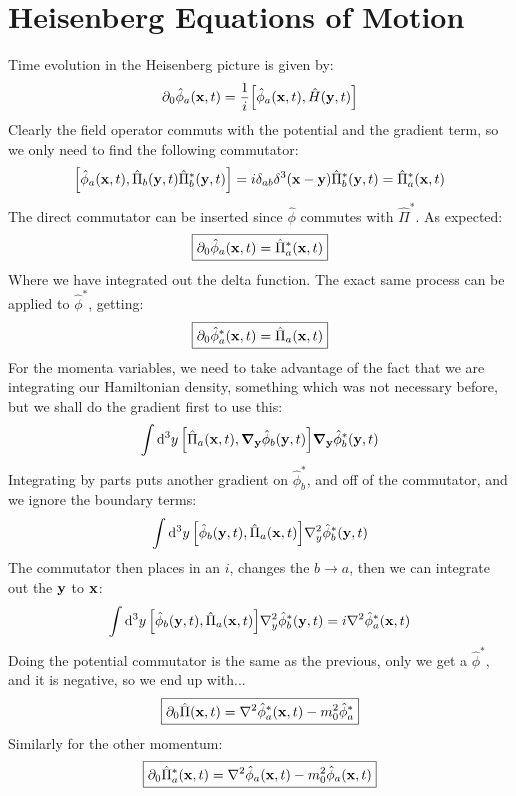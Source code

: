 \documentclass[12pt]{article}
\newcommand{\D}{\partial}
\newcommand{\phih}{\hat{\phi}}
\newcommand{\phish}{\hat{\phi}^*}
\newcommand{\pih}{\hat{\Pi}}
\newcommand{\pish}{\hat{\Pi}^*}
\begin{document}
\section{Heisenberg Equations of Motion}
Time evolution in the Heisenberg picture is given by:
\begin{align*}
  \D_0\phih_a(\vb{x},t)=\frac{1}{i}\comm{\phih_a(\vb{x},t)}{\hat{H}(\vb{y},t)}
\end{align*}
Clearly the field operator commuts with the potential and the gradient term, so we only need to find the following commutator:
\begin{align*}
  \comm{\phih_a(\vb{x},t)}{\pih_b(\vb{y},t)\pish_b(\vb{y},t)}=
  i\delta_{ab}\delta^3(\vb{x}-\vb{y})\pish_b(\vb{y},t)=\pish_a(\vb{x},t)
\end{align*}
The direct commutator can be inserted since $\phih$ commutes with $\pish$. As expected:
\begin{align*}
  \boxed{\D_0\phih_a(\vb{x},t)=\pish_a(\vb{x},t)}
\end{align*}
Where we have integrated out the delta function. The exact same process can be applied to $\phish$, getting:
\begin{align*}
  \boxed{\D_0\phish_a(\vb{x},t)=\pih_a(\vb{x},t)}
\end{align*}
For the momenta variables, we need to take advantage of the fact that we are integrating our Hamiltonian density, something which was not necessary before, but we shall do the gradient first to use this:
\begin{align*}
  \int\dd[3]{y}\comm{\pih_a(\vb{x},t)}{\grad_{\vb{y}}{\phih_b(\vb{y},t)}}
  \grad_{\vb{y}}\phish_b(\vb{y},t)
\end{align*}
Integrating by parts puts another gradient on $\phish_b$, and off of the commutator, and we ignore the boundary terms:
\begin{align*}
  \int\dd[3]{y}\comm{\phih_b(\vb{y},t)}{\pih_a(\vb{x},t)}
  \laplacian_y{\phish_b(\vb{y},t)}
\end{align*}
The commutator then places in an $i$, changes the $b\to a$, then we can integrate out the $\vb{y}$ to $\vb{x}$:
\begin{align*}
  \int\dd[3]{y}\comm{\phih_b(\vb{y},t)}{\pih_a(\vb{x},t)}
  \laplacian_y{\phish_b(\vb{y},t)}=i\laplacian{\phish_a(\vb{x},t)}
\end{align*}
Doing the potential commutator is the same as the previous, only we get a $\phish$, and it is negative, so we end up with...
\begin{align*}
  \boxed{\D_0\pih(\vb{x},t)=\laplacian{\phish_a(\vb{x},t)}-m_0^2\phish_a}
\end{align*}
Similarly for the other momentum:
\begin{align*}
  \boxed{\D_0\pish_a(\vb{x},t)=
    \laplacian{\phih_a(\vb{x},t)}-m_0^2\phih_a(\vb{x},t)}
\end{align*}
\end{document}
